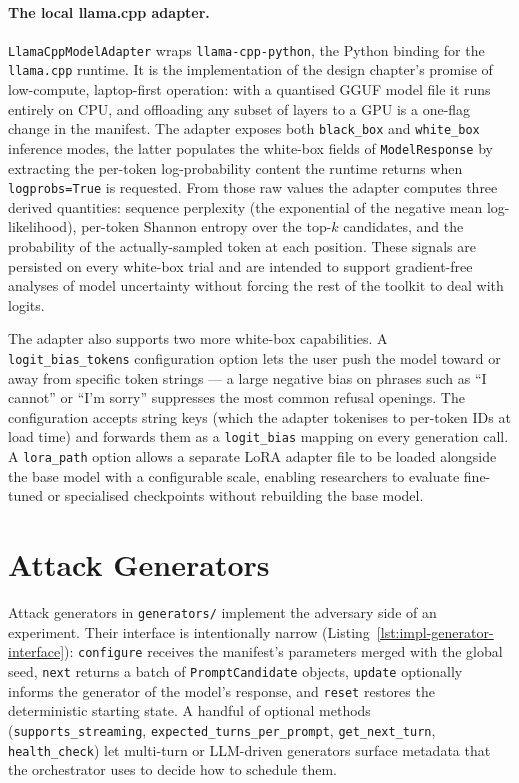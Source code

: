 \paragraph{The local llama.cpp adapter.}
\texttt{LlamaCppModelAdapter} wraps \texttt{llama-cpp-python}, the Python binding for the \texttt{llama.cpp} runtime.
It is the implementation of the design chapter's promise of low-compute, laptop-first operation: with a quantised GGUF model file it runs entirely on CPU, and offloading any subset of layers to a GPU is a one-flag change in the manifest.
The adapter exposes both \texttt{black\_box} and \texttt{white\_box} inference modes, the latter populates the white-box fields of \texttt{ModelResponse} by extracting the per-token log-probability content the runtime returns when \texttt{logprobs=True} is requested.
From those raw values the adapter computes three derived quantities: sequence perplexity (the exponential of the negative mean log-likelihood), per-token Shannon entropy over the top-$k$ candidates, and the probability of the actually-sampled token at each position.
These signals are persisted on every white-box trial and are intended to support gradient-free analyses of model uncertainty without forcing the rest of the toolkit to deal with logits.

The adapter also supports two more white-box capabilities.
A \texttt{logit\_bias\_tokens} configuration option lets the user push the model toward or away from specific token strings --- a large negative bias on phrases such as ``I cannot'' or ``I'm sorry'' suppresses the most common refusal openings.
The configuration accepts string keys (which the adapter tokenises to per-token IDs at load time) and forwards them as a \texttt{logit\_bias} mapping on every generation call.
A \texttt{lora\_path} option allows a separate LoRA adapter file to be loaded alongside the base model with a configurable scale, enabling researchers to evaluate fine-tuned or specialised checkpoints without rebuilding the base model.

\section{Attack Generators}\label{sec:impl-generators}

Attack generators in \texttt{generators/} implement the adversary side of an experiment.
Their interface is intentionally narrow (Listing~\ref{lst:impl-generator-interface}): \texttt{configure} receives the manifest's parameters merged with the global seed, \texttt{next} returns a batch of \texttt{PromptCandidate} objects, \texttt{update} optionally informs the generator of the model's response, and \texttt{reset} restores the deterministic starting state.
A handful of optional methods (\texttt{supports\_streaming}, \texttt{expected\_turns\_per\_prompt}, \texttt{get\_next\_turn}, \texttt{health\_check}) let multi-turn or LLM-driven generators surface metadata that the orchestrator uses to decide how to schedule them.

